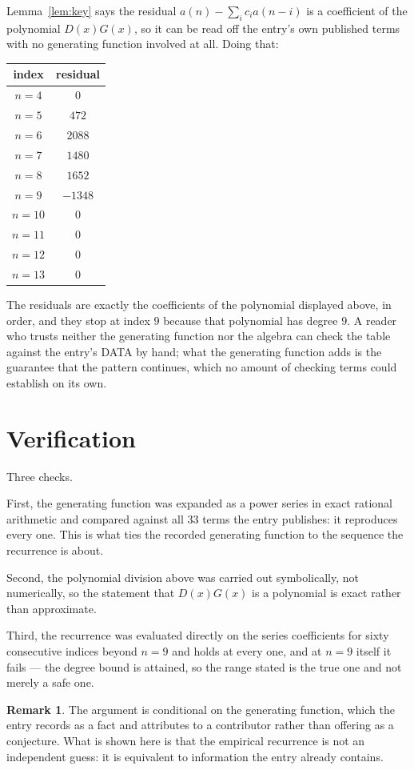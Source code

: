 \documentclass[11pt,a4paper]{article}
\theoremstyle{plain}
\theoremstyle{definition}
\newtheorem{remark}[theorem]{Remark}
\begin{document}
Lemma~\ref{lem:key} says the residual $a(n)-\sum_ic_ia(n-i)$ is a coefficient of the
polynomial $D(x)G(x)$, so it can be read off the entry's own published terms with no
generating function involved at all. Doing that:
\begin{center}
\begin{tabular}{cc}
index & residual \\ \hline
$n=4$ & $0$ \\
$n=5$ & $472$ \\
$n=6$ & $2088$ \\
$n=7$ & $1480$ \\
$n=8$ & $1652$ \\
$n=9$ & $-1348$ \\
$n=10$ & $0$ \\
$n=11$ & $0$ \\
$n=12$ & $0$ \\
$n=13$ & $0$
\end{tabular}
\end{center}
The residuals are exactly the coefficients of the polynomial displayed above, in order, and
they stop at index $9$ because that polynomial has degree $9$. A reader who trusts
neither the generating function nor the algebra can check the table against the entry's DATA
by hand; what the generating function adds is the guarantee that the pattern continues, which
no amount of checking terms could establish on its own.

\section{Verification}

Three checks.

First, the generating function was expanded as a power series in exact rational arithmetic and
compared against all $33$ terms the entry publishes: it reproduces every one. This is
what ties the recorded generating function to the sequence the recurrence is about.

Second, the polynomial division above was carried out symbolically, not numerically, so the
statement that $D(x)G(x)$ is a polynomial is exact rather than approximate.

Third, the recurrence was evaluated directly on the series coefficients for sixty consecutive
indices beyond $n=9$ and holds at every one, and at $n=9$ itself it fails --- the
degree bound is attained, so the range stated is the true one and not merely a safe one.

\begin{remark}
The argument is conditional on the generating function, which the entry records as a fact and
attributes to a contributor rather than offering as a conjecture. What is shown here is that
the empirical recurrence is not an independent guess: it is equivalent to information the
entry already contains.
\end{remark}
\end{document}

